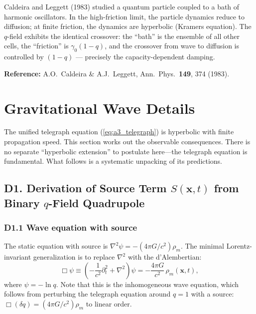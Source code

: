 \documentclass[reprint]{revtex4-2}
\begin{document}
Caldeira and Leggett (1983) studied a quantum particle coupled to a bath of harmonic oscillators. In the high-friction limit, the particle dynamics reduce to diffusion; at finite friction, the dynamics are hyperbolic (Kramers equation). The $q$-field exhibits the identical crossover: the ``bath'' is the ensemble of all other cells, the ``friction'' is $\gamma_0(1-q)$, and the crossover from wave to diffusion is controlled by $(1-q)$ --- precisely the capacity-dependent damping.

\textbf{Reference:} A.O.\ Caldeira \& A.J.\ Leggett, Ann.\ Phys.\ \textbf{149}, 374 (1983).

\section{Gravitational Wave Details}

The unified telegraph equation (\ref{eq:a3_telegraph}) is hyperbolic with finite propagation speed. This section works out the observable consequences. There is no separate ``hyperbolic extension'' to postulate here---the telegraph equation is fundamental. What follows is a systematic unpacking of its predictions.

\subsection{D1. Derivation of Source Term $S(\mathbf{x},t)$ from Binary $q$-Field Quadrupole}

\subsubsection{D1.1 Wave equation with source}

The static equation with source is $\nabla^2\psi = -(4\pi G/c^2)\rho_m$. The minimal Lorentz-invariant generalization is to replace $\nabla^2$ with the d'Alembertian:
\begin{equation}
\Box\psi \equiv \left(-\frac{1}{c^2}\partial_t^2 + \nabla^2\right)\psi = -\frac{4\pi G}{c^2}\,\rho_m(\mathbf{x},t),
\label{eq:scalar_wave}
\end{equation}
where $\psi = -\ln q$. Note that this is the inhomogeneous wave equation, which follows from perturbing the telegraph equation around $q=1$ with a source: $\Box(\delta q) = (4\pi G/c^2)\rho_m$ to linear order.
\end{document}
